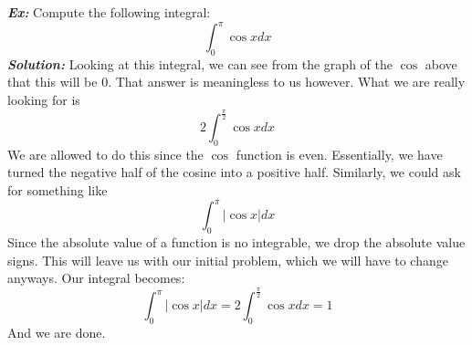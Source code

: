 \documentclass{article}
\begin{document}
\textbf{\textit{Ex:}} Compute the following integral:
\[
\int_{0}^{\pi}\cos{x}dx
\]
\indent \textbf{\textit{Solution:}} Looking at this integral, we can see from the graph of the $\cos$ above that this will be 0. That answer is meaningless to us however. What we are really looking for is
\[
2\int_{0}^{\frac{\pi}{2}}\cos{x}dx
\]
\noindent We are allowed to do this since the $\cos$ function is even. Essentially, we have turned the negative half of the cosine into a positive half. Similarly, we could ask for something like
\[
\int_{0}^{\pi}|\cos{x}|dx
\]
\noindent Since the absolute value of a function is no integrable, we drop the absolute value signs. This will leave us with our initial problem, which we will have to change anyways. Our integral becomes:
\[
\int_{0}^{\pi}|\cos{x}|dx = 2\int_{0}^{\frac{\pi}{2}}\cos{x}dx = 1
\]
\noindent And we are done.
\newpage
\end{document}
